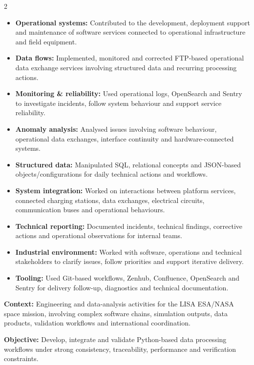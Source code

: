 \documentclass[8pt,a4paper,ragged2e,withhyper]{altacv}
\begin{document}
\begin{paracol}{2}
\begin{itemize}
  \item \textbf{Operational systems:} Contributed to the development, deployment support and maintenance of software services connected to operational infrastructure and field equipment.
  \item \textbf{Data flows:} Implemented, monitored and corrected FTP-based operational data exchange services involving structured data and recurring processing actions.
  \item \textbf{Monitoring \& reliability:} Used operational logs, OpenSearch and Sentry to investigate incidents, follow system behaviour and support service reliability.
  \item \textbf{Anomaly analysis:} Analysed issues involving software behaviour, operational data exchanges, interface continuity and hardware-connected systems.
  \item \textbf{Structured data:} Manipulated SQL, relational concepts and JSON-based objects/configurations for daily technical actions and workflows.
  \item \textbf{System integration:} Worked on interactions between platform services, connected charging stations, data exchanges, electrical circuits, communication buses and operational behaviours.
  \item \textbf{Technical reporting:} Documented incidents, technical findings, corrective actions and operational observations for internal teams.
  \item \textbf{Industrial environment:} Worked with software, operations and technical stakeholders to clarify issues, follow priorities and support iterative delivery.
  \item \textbf{Tooling:} Used Git-based workflows, Zenhub, Confluence, OpenSearch and Sentry for delivery follow-up, diagnostics and technical documentation.
\end{itemize}

\divider


\textbf{Context:} Engineering and data-analysis activities for the LISA ESA/NASA space mission, involving complex software chains, simulation outputs, data products, validation workflows and international coordination.

\textbf{Objective:} Develop, integrate and validate Python-based data processing workflows under strong consistency, traceability, performance and verification constraints.


\end{paracol}
\end{document}
